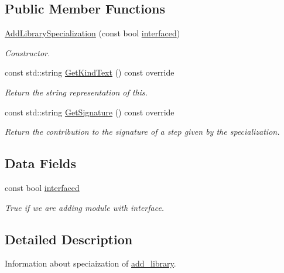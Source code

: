 \subsection*{Public Member Functions}
\begin{DoxyCompactItemize}
\item 
\hyperlink{classAddLibrarySpecialization_a37df5ad6204b4a17d5cca460bf6d5fd8}{Add\+Library\+Specialization} (const bool \hyperlink{classAddLibrarySpecialization_aa556c3ab64f1e7c6bde606aa2e848502}{interfaced})
\begin{DoxyCompactList}\small\item\em Constructor. \end{DoxyCompactList}\item 
const std\+::string \hyperlink{classAddLibrarySpecialization_a456faa44646d3e8b63b8f77e11c88caa}{Get\+Kind\+Text} () const override
\begin{DoxyCompactList}\small\item\em Return the string representation of this. \end{DoxyCompactList}\item 
const std\+::string \hyperlink{classAddLibrarySpecialization_ab2e29e010e6b3e2a708539770e5de646}{Get\+Signature} () const override
\begin{DoxyCompactList}\small\item\em Return the contribution to the signature of a step given by the specialization. \end{DoxyCompactList}\end{DoxyCompactItemize}
\subsection*{Data Fields}
\begin{DoxyCompactItemize}
\item 
const bool \hyperlink{classAddLibrarySpecialization_aa556c3ab64f1e7c6bde606aa2e848502}{interfaced}
\begin{DoxyCompactList}\small\item\em True if we are adding module with interface. \end{DoxyCompactList}\end{DoxyCompactItemize}


\subsection{Detailed Description}
Information about speciaization of \hyperlink{classadd__library}{add\+\_\+library}. 

